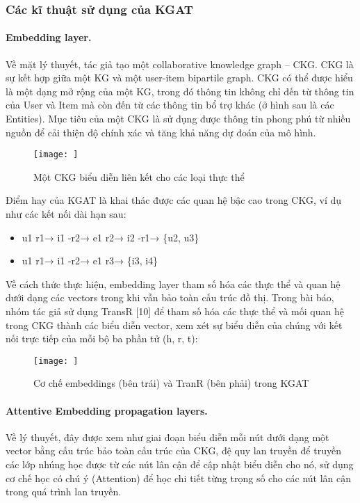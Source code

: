 \subsubsection{Các kĩ thuật sử dụng của KGAT}
\paragraph{Embedding layer.}
Về mặt lý thuyết, tác giả tạo một collaborative knowledge graph – CKG. CKG là sự kết hợp giữa một KG và một user-item bipartile graph. CKG có thể được hiểu là một dạng mở rộng của một KG, trong đó thông tin không chỉ đến từ thông tin của User và Item mà còn đến từ các thông tin bổ trợ khác (ở hình sau là các Entities). Mục tiêu của một CKG là sử dụng được thông tin phong phú từ nhiều nguồn để cải thiện độ chính xác và tăng khả năng dự đoán của mô hình.

\begin{figure}[h]
    \centering
    \texttt{[image: ]}
    \caption{Một CKG biểu diễn liên kết cho các loại thực thể}
    \label{fig:ckg_example}
\end{figure}

Điểm hay của KGAT là khai thác được các quan hệ bậc cao trong CKG, ví dụ như các kết nối dài hạn sau:
\begin{itemize}
    \item u1  r1→  i1  -r2→  e1  r2→  i2  -r1→  \{u2,  u3\}
    \item u1  r1→  i1  -r2→  e1  r3→ \{i3,  i4\}
\end{itemize}

Về cách thức thực hiện, embedding layer tham số hóa các thực thể và quan hệ dưới dạng các vectors trong khi vẫn bảo toàn cấu trúc đồ thị. Trong bài báo, nhóm tác giả sử dụng TransR [10] để tham số hóa các thực thể và mối quan hệ trong CKG thành các biểu diễn vector, xem xét sự biểu diễn của chúng với kết nối trực tiếp của mỗi bộ ba phần tử (h, r, t):

\begin{figure}[h]
    \centering
    \texttt{[image: ]}
    \caption{Cơ chế embeddings (bên trái) và TranR (bên phải) trong KGAT}
    \label{fig:embedding_process}
\end{figure}

\paragraph{Attentive Embedding propagation layers.}
Về lý thuyết, đây được xem như giai đoạn biểu diễn mỗi nút dưới dạng một vector bằng cấu trúc bảo toàn cấu trúc của CKG, đệ quy lan truyền để truyền các lớp nhúng học được từ các nút lân cận để cập nhật biểu diễn cho nó, sử dụng cơ chế học có chú ý (Attention) để học chi tiết từng trọng số cho các nút lân cận trong quá trình lan truyền.

